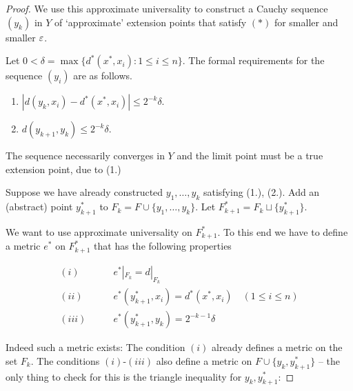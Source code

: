 \begin{proof}
%  
% 
% 
% 
% 

We use this approximate universality to construct a Cauchy sequence $(y_k)$ in $Y$ of `approximate' extension points that satisfy $(*)$ for smaller and smaller $\varepsilon$.

Let $0 < \delta = \max \{d^*(x^*,x_i) \colon 1 \leq i \leq n \}$.
The formal requirements for the sequence $(y_i)$ are as follows.

\begin{enumerate}
\item $|d(y_k,x_i) - d^*(x^*,x_i)| \leq 2^{ -k} \delta$.
\item $d(y_{k+1},y_k) \leq 2^{ -k}\delta$.
\end{enumerate}

The sequence necessarily converges in $Y$ and the limit point must be a true extension point, due to (1.)

Suppose we have already constructed $y_1, \dots, y_k$ satisfying (1.), (2.). Add an (abstract) point $y^*_{k+1}$ to $F_k = F \cup \{y_1, \dots, y_k\}$. Let $F^*_{k+1} = F_k \sqcup \{y^*_{k+1}\}$.

We want to use approximate universality on $F^*_{k+1}$. To this end we have to define a metric $e^*$ on $F^*_{k+1}$ that has the following properties

\begin{align*}
	(i) 	\qquad	& e^*|_{F_k} = d|_{F_k} \\
	(ii)  	\qquad & e^*(y^*_{k+1},x_i) = d^*(x^*,x_i) \quad (1 \leq i \leq n) \\
	(iii)	\qquad 	& e^*(y^*_{k+1}, y_k) = 2^{-k-1}\delta 
\end{align*}

Indeed such a metric exists: The condition $(i)$ already defines a metric on the set $F_k$. The conditions $(i)$-$(iii)$ also define a metric on $F \cup \{y_k,y^*_{k+1}\}$ -- the only thing to check for this is the triangle inequality for $y_k, y^*_{k+1}$:


\end{proof}
